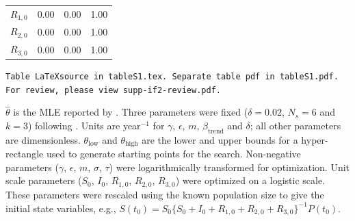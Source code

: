 \documentclass[11pt]{article}
\begin{document}
\begin{center}
{\begin{tabular}{lrrr}
  $R_{1,0}$ & 0.00 & 0.00 & 1.00 \\ 
  $R_{2,0}$ & 0.00 & 0.00 & 1.00 \\ 
  $R_{3,0}$ & 0.00 & 0.00 & 1.00 \\ 
   \hline
\end{tabular}}{\medskip\texttt{Table \LaTeX source in tableS1.tex. Separate table pdf in tableS1.pdf. For review, please view supp-if2-review.pdf.} \vspace{1cm}}  
\parbox{8cm}{\small
{$\hat\theta$ is the MLE reported by \cite{king08}.
Three parameters were fixed ($\delta=0.02$, $N_s=6$ and $k=3$) following \cite{king08}. 
Units are year$^{-1}$ for $\gamma$, $\epsilon$, $m$, $\beta_{\mathrm{trend}}$ and $\delta$;  all other parameters are dimensionless.
$\theta_\mathrm{low}$ and $\theta_\mathrm{high}$ are the lower and upper bounds for a hyper-rectangle used to generate starting points for the search.
Non-negative parameters ($\gamma$, $\epsilon$, $m$, $\sigma$, $\tau$) were logarithmically transformed for optimization.
Unit scale parameters ($S_0$, $I_0$, $R_{1,0}$, $R_{2,0}$,  $R_{3,0}$) were optimized on a logistic scale. 
These parameters were rescaled using the known population size to give the initial state variables, e.g., $S(t_0)=S_0\{ S_0+I_0+R_{1,0}+R_{2,0}+R_{3,0}\}^{-1} P(t_0)$.}
} 
\end{center}


\clearpage


\end{document}
